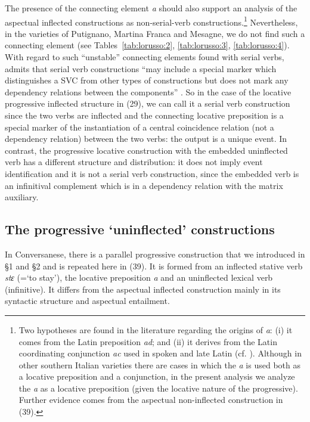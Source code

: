 \documentclass[output=paper]{langsci/langscibook}
\begin{document}
The presence of the connecting element \textit{a} should also support an analysis of the aspectual inflected constructions as non-serial-verb constructions.\footnote{Two hypotheses are found in the literature regarding the origins of \textit{a}: (i) it comes from the Latin preposition \textit{ad}; and (ii) it derives from the Latin coordinating conjunction \textit{ac} used in spoken and late Latin (cf. \citealt[§§710,761]{Rohlfs1969}). Although in other southern Italian varieties there are cases in which the \textit{a} is used both as a locative preposition and a conjunction, in the present analysis we analyze the \textit{a} as a locative preposition (given the locative nature of the progressive). Further evidence comes from the aspectual non-inflected construction in (39).} Nevertheless, in the varieties of Putignano, Martina Franca and Mesagne, we do not find such a connecting element (see Tables~\ref{tab:lorusso:2}, \ref{tab:lorusso:3}, \ref{tab:lorusso:4}). With regard to such “unstable” connecting elements found with serial verbs, \citet{Aikhenvald2006} admits that serial verb constructions “may include a special marker which distinguishes a SVC from other types of constructions but does not mark any dependency relations between the components” \citep[20]{Aikhenvald2006}. So in the case of the locative progressive inflected structure in (29), we can call it a serial verb construction since the two verbs are inflected and the connecting locative preposition is a special marker of the instantiation of a central coincidence relation (not a dependency relation) between the two verbs: the output is a unique event. In contrast, the progressive locative construction with the embedded uninflected verb has a different structure and distribution: it does not imply event identification and it is not a serial verb construction, since the embedded verb is an infinitival complement which is in a dependency relation with the matrix auxiliary. 

\subsection{The progressive ‘uninflected’ constructions}%

In Conversanese, there is a parallel progressive construction that we introduced in §1 and §2 and is repeated here in (39). It is formed from an inflected stative verb \textit{stɛ} (=‘to stay’), the locative preposition \textit{a} and an uninflected lexical verb (infinitive). It differs from the aspectual inflected construction mainly in its syntactic structure and aspectual entailment. 
\end{document}
